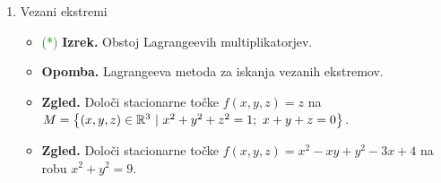 \begin{enumerate}
    \item Vezani ekstremi
    
    \begin{itemize}
        \item \textcolor{green}{(*)} \textbf{Izrek.} Obstoj Lagrangeevih multiplikatorjev.
        \item \textbf{Opomba.} Lagrangeeva metoda za iskanja vezanih ekstremov.
        \item \textbf{Zgled.} Določi stacionarne točke $f(x,y,z)=z$ na $M = \left\{(x,y,z) \in \mathbb{R}^3 \ | \ x^2+y^2+z^2=1; \ x+ y + z = 0\right\}$.
        \item \textbf{Zgled.} Določi stacionarne točke  $f(x,y,z)= x^2 - xy +y^2 - 3x +4$ na robu $x^2 + y^2 = 9$. 
    \end{itemize}
\end{enumerate}